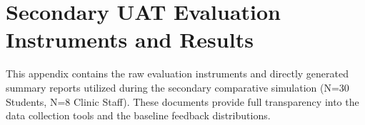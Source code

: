 \chapter{Secondary UAT Evaluation Instruments and \mbox{Results}}
\label{appendix:r}

This appendix contains the raw evaluation instruments and directly generated summary reports utilized during the secondary comparative simulation (N=30 Students, N=8 Clinic Staff). These documents provide full transparency into the data collection tools and the baseline feedback distributions.




